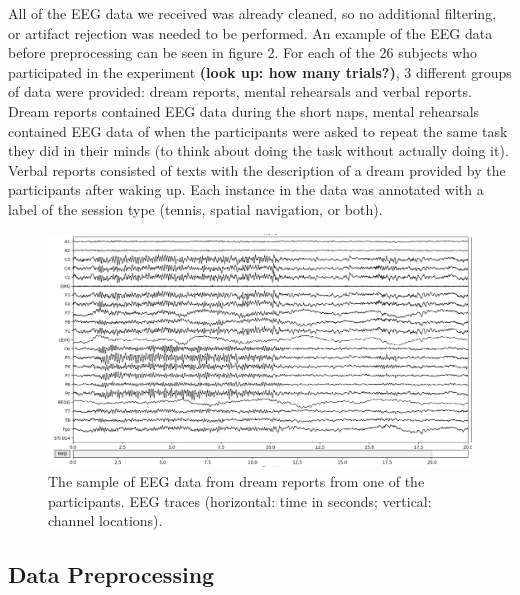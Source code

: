 \documentclass{article}
\begin{document}
All of the EEG data we received was already cleaned, so no additional filtering, or artifact rejection was needed to be performed. An example of the EEG data before preprocessing can be seen in figure 2.  For each of the 26 subjects who participated in the experiment \textbf{(look up: how many trials?)}, 3 different groups of data were provided: dream reports, mental rehearsals and verbal reports.  Dream reports contained EEG data during the short naps, mental rehearsals contained EEG data of when the participants were asked to repeat the same task they did in their minds (to think about doing the task without actually doing it). Verbal reports consisted of texts with the description of a dream provided by the participants after waking up. Each instance in the data was annotated with a label of the session type (tennis, spatial navigation, or both).
\begin{figure}[!ht]
	\centering
	\includegraphics[scale=0.2]{eeg_ex}
	\caption{The sample of EEG data from dream reports from one of the participants. EEG traces (horizontal: time in seconds; vertical: channel locations).}
\end{figure} 

\subsection{Data Preprocessing}
\end{document}
